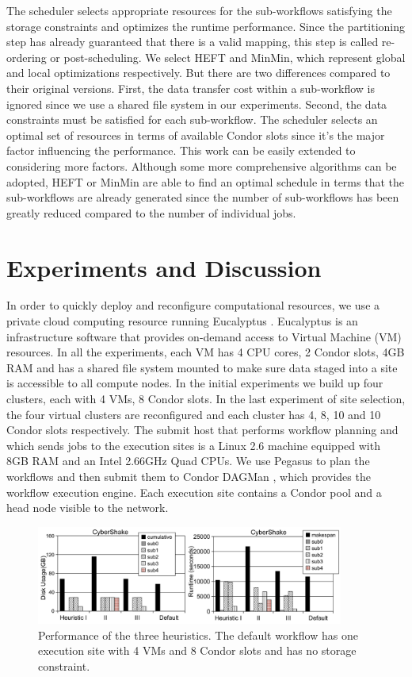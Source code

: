 The scheduler selects appropriate resources for the sub-workflows satisfying the storage constraints and optimizes the runtime performance. Since the partitioning step has already guaranteed that there is a valid mapping, this step is called re-ordering or post-scheduling. We select HEFT\cite{Topcuoglu2002} and MinMin\cite{Blythe2005}, which represent global and local optimizations respectively. But there are two differences compared to their original versions. First, the data transfer cost within a sub-workflow is ignored since we use a shared file system in our experiments. Second, the data constraints must be satisfied for each sub-workflow. 
The scheduler selects an optimal set of resources in terms of available Condor slots since it’s the major factor influencing the performance. This work can be easily extended to considering more factors. Although some more comprehensive algorithms can be adopted, HEFT or MinMin are able to find an optimal schedule in terms that the sub-workflows are already generated since the number of sub-workflows has been greatly reduced compared to the number of individual jobs.

\section{Experiments and Discussion}
In order to quickly deploy and reconfigure computational resources, we use a private cloud computing resource running Eucalyptus \cite{Nurmi2008b}. Eucalyptus is an infrastructure software that provides on-demand access to Virtual Machine (VM) resources. In all the experiments, each VM has 4 CPU cores, 2 Condor slots, 4GB RAM and has a shared file system mounted to make sure data staged into a site is accessible to all compute nodes. In the initial experiments we build up four clusters, each with 4 VMs, 8 Condor slots. In the last experiment of site selection, the four virtual clusters are reconfigured and each cluster has 4, 8, 10 and 10 Condor slots respectively. The submit host that performs workflow planning and which sends jobs to the execution sites is a Linux 2.6 machine equipped with 8GB RAM and an Intel 2.66GHz Quad CPUs. We use Pegasus to plan the workflows and then submit them to Condor DAGMan \cite{DAGMan}, which provides the workflow execution engine. Each execution site contains a Condor pool and a head node visible to the network. 

\begin{figure}[h!]
	\centering
    \includegraphics[width=0.9\textwidth]{figures/partitioning/heuristics.pdf}
    \caption{Performance of the three heuristics. The default workflow has one execution site with 4 VMs and 8 Condor slots and has no storage constraint.}
    \label{fig:heuristics}
\end{figure}

